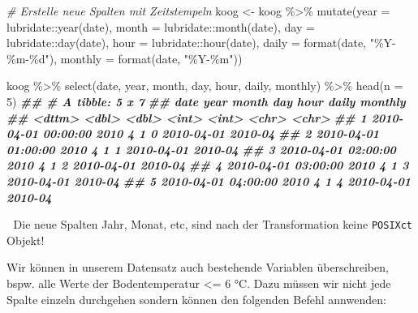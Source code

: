 \documentclass[
]{article}
\newenvironment{Shaded}{\begin{snugshade}}{\end{snugshade}}
\newcommand{\AttributeTok}[1]{\textcolor[rgb]{0.77,0.63,0.00}{#1}}
\newcommand{\CommentTok}[1]{\textcolor[rgb]{0.56,0.35,0.01}{\textit{#1}}}
\newcommand{\DecValTok}[1]{\textcolor[rgb]{0.00,0.00,0.81}{#1}}
\newcommand{\DocumentationTok}[1]{\textcolor[rgb]{0.56,0.35,0.01}{\textbf{\textit{#1}}}}
\newcommand{\FunctionTok}[1]{\textcolor[rgb]{0.00,0.00,0.00}{#1}}
\newcommand{\NormalTok}[1]{#1}
\newcommand{\OtherTok}[1]{\textcolor[rgb]{0.56,0.35,0.01}{#1}}
\newcommand{\SpecialCharTok}[1]{\textcolor[rgb]{0.00,0.00,0.00}{#1}}
\newcommand{\StringTok}[1]{\textcolor[rgb]{0.31,0.60,0.02}{#1}}
\begin{document}
\begin{Shaded}
\begin{Highlighting}[]
\CommentTok{\# Erstelle neue Spalten mit Zeitstempeln}
\NormalTok{koog }\OtherTok{\textless{}{-}}\NormalTok{ koog }\SpecialCharTok{\%\textgreater{}\%}
  \FunctionTok{mutate}\NormalTok{(}\AttributeTok{year =}\NormalTok{ lubridate}\SpecialCharTok{::}\FunctionTok{year}\NormalTok{(date),}
         \AttributeTok{month =}\NormalTok{ lubridate}\SpecialCharTok{::}\FunctionTok{month}\NormalTok{(date),}
         \AttributeTok{day =}\NormalTok{ lubridate}\SpecialCharTok{::}\FunctionTok{day}\NormalTok{(date),}
         \AttributeTok{hour =}\NormalTok{ lubridate}\SpecialCharTok{::}\FunctionTok{hour}\NormalTok{(date), }
         \AttributeTok{daily =} \FunctionTok{format}\NormalTok{(date, }\StringTok{"\%Y{-}\%m{-}\%d"}\NormalTok{),}
         \AttributeTok{monthly =} \FunctionTok{format}\NormalTok{(date, }\StringTok{"\%Y{-}\%m"}\NormalTok{))}

\NormalTok{koog }\SpecialCharTok{\%\textgreater{}\%}
  \FunctionTok{select}\NormalTok{(date, year, month, day, hour, daily, monthly) }\SpecialCharTok{\%\textgreater{}\%}
  \FunctionTok{head}\NormalTok{(}\AttributeTok{n =} \DecValTok{5}\NormalTok{)}
\DocumentationTok{\#\# \# A tibble: 5 x 7}
\DocumentationTok{\#\#   date                 year month   day  hour daily      monthly}
\DocumentationTok{\#\#   \textless{}dttm\textgreater{}              \textless{}dbl\textgreater{} \textless{}dbl\textgreater{} \textless{}int\textgreater{} \textless{}int\textgreater{} \textless{}chr\textgreater{}      \textless{}chr\textgreater{}  }
\DocumentationTok{\#\# 1 2010{-}04{-}01 00:00:00  2010     4     1     0 2010{-}04{-}01 2010{-}04}
\DocumentationTok{\#\# 2 2010{-}04{-}01 01:00:00  2010     4     1     1 2010{-}04{-}01 2010{-}04}
\DocumentationTok{\#\# 3 2010{-}04{-}01 02:00:00  2010     4     1     2 2010{-}04{-}01 2010{-}04}
\DocumentationTok{\#\# 4 2010{-}04{-}01 03:00:00  2010     4     1     3 2010{-}04{-}01 2010{-}04}
\DocumentationTok{\#\# 5 2010{-}04{-}01 04:00:00  2010     4     1     4 2010{-}04{-}01 2010{-}04}
\end{Highlighting}
\end{Shaded}

🚨 Die neue Spalten Jahr, Monat, etc, sind nach der Transformation keine \texttt{POSIXct} Objekt!

Wir können in unserem Datensatz auch bestehende Variablen überschreiben, bspw. alle Werte der Bodentemperatur \textless= 6 °C. Dazu müssen wir nicht jede Spalte einzeln durchgehen sondern können den folgenden Befehl annwenden:
\end{document}
